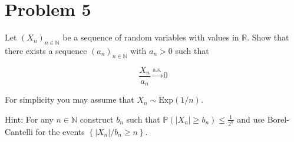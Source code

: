 \documentclass{qlnotes-export}
\begin{document}
\section{Problem 5}\label{problem-5-5}

Let \(\left( X_{n} \right)_{n \in {\mathbb{N}}}\) be a sequence of random variables with values in \(\mathbb{R}\). Show that there exists a sequence \(\left( a_{n} \right)_{n \in {\mathbb{N}}}\) with \(a_{n} > 0\) such that

\[\frac{X_{n}}{a_{n}}\overset{\text{a.s.}}{\rightarrow}0\]

For simplicity you may assume that \(X_{n} \sim \text{Exp}(1/n)\).

Hint: For any \(n \in {\mathbb{N}}\) construct \(b_{n}\) such that \({\mathbb{P}}\left( {\left| X_{n} \right| \geq b_{n}} \right) \leq \frac{1}{2^{n}}\) and use Borel-Cantelli for the events \(\left\{ {\left| X_{n} \right|/b_{n} \geq n} \right\}\).
\end{document}
